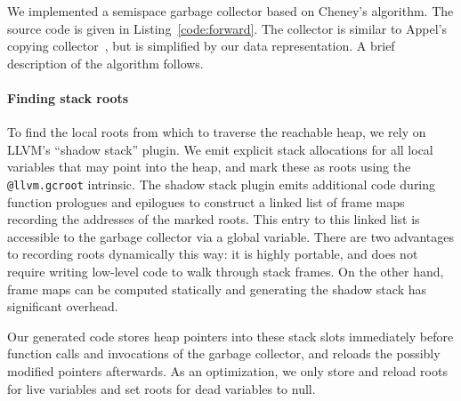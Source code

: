\documentclass{article}
\begin{document}
We implemented a semispace garbage collector based on Cheney's algorithm. The source code is given in Listing~\ref{code:forward}. The collector is similar to Appel's copying collector~\cite{Appel90aruntime}, but is simplified by our data representation. A brief description of the algorithm follows.

\paragraph{Finding stack roots} To find the local roots from which to traverse the reachable heap, we rely on LLVM's ``shadow stack'' plugin. We emit explicit stack allocations for all local variables that may point into the heap, and mark these as roots using the \lstinline!@llvm.gcroot! intrinsic. The shadow stack plugin emits additional code during function prologues and epilogues to construct a linked list of frame maps recording the addresses of the marked roots. This entry to this linked list is accessible to the garbage collector via a global variable. There are two advantages to recording roots dynamically this way: it is highly portable, and does not require writing low-level code to walk through stack frames. On the other hand, frame maps can be computed statically and generating the shadow stack has significant overhead.

Our generated code stores heap pointers into these stack slots immediately before function calls and invocations of the garbage collector, and reloads the possibly modified pointers afterwards. As an optimization, we only store and reload roots for live variables and set roots for dead variables to null.
\end{document}
